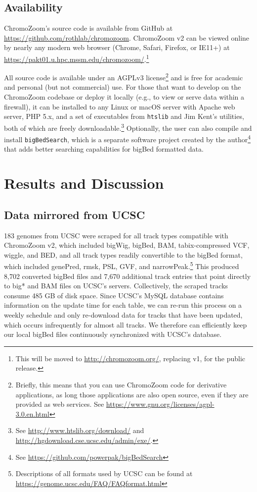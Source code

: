 \subsection{Availability}

ChromoZoom's source code is available from GitHub at \url{https://github.com/rothlab/chromozoom}. ChromoZoom v2 can be viewed online by nearly any modern web browser (Chrome, Safari, Firefox, or IE11+) at \url{https://pakt01.u.hpc.mssm.edu/chromozoom/}.\footnote{This will be moved to \url{http://chromozoom.org/}, replacing v1, for the public release.}

All source code is available under an AGPLv3 license\footnote{Briefly, this means that you can use ChromoZoom code for derivative applications, as long those applications are also open source, even if they are provided as web services. See \url{https://www.gnu.org/licenses/agpl-3.0.en.html}} and is free for academic and personal (but not commercial) use. For those that want to develop on the ChromoZoom codebase or deploy it locally (e.g., to view or serve data within a firewall), it can be installed to any Linux or macOS server with Apache web server, PHP 5.x, and a set of executables from \texttt{htslib} and Jim Kent's utilities, both of which are freely downloadable.\footnote{See \url{http://www.htslib.org/download/} and \url{http://hgdownload.cse.ucsc.edu/admin/exe/}.} Optionally, the user can also compile and install \texttt{bigBedSearch}, which is a separate software project created by the author\footnote{See \url{https://github.com/powerpak/bigBedSearch}} that adds better searching capabilities for bigBed formatted data.

\section{Results and Discussion}

\subsection{Data mirrored from UCSC}

183 genomes from UCSC were scraped for all track types compatible with ChromoZoom v2, which included bigWig, bigBed, BAM,\autocite{Li2009b} tabix-compressed VCF,\autocite{Danecek2011,Li2011} wiggle, and BED, and all track types readily convertible to the bigBed format, which included genePred, rmsk, PSL, GVF, and narrowPeak.\footnote{Descriptions of all formats used by UCSC can be found at \url{https://genome.ucsc.edu/FAQ/FAQformat.html}} This produced 8,702 converted bigBed files and 7,670 additional track entries that point directly to big* and BAM files on UCSC's servers. Collectively, the scraped tracks consume 485 GB of disk space. Since UCSC's MySQL database contains information on the update time for each table, we can re-run this process on a weekly schedule and only re-download data for tracks that have been updated, which occurs infrequently for almost all tracks. We therefore can efficiently keep our local bigBed files continuously synchronized with UCSC's database.

